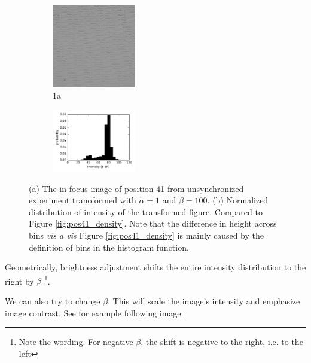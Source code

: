 \documentclass[pdftex,12pt,a4paper]{report}
\begin{document}
\begin{figure}[H]
\centering

\begin{subfigure}{\textwidth}
  \centering
  \includegraphics[width=0.4\textwidth]{images/pos_41_in_t0_br_up100}
  \caption{1a}
  \label{fig:pos41_brup100_bf}
\end{subfigure}%

\begin{subfigure}{\textwidth}
  \centering
  \includegraphics[width=0.4\textwidth]{images/pos_41_in_t0_br_up100_hist}
  \caption{}
  \label{fig:pos41_brup100_hist}
\end{subfigure}%

\caption{(a) The in-focus image of position 41 from unsynchronized experiment tranoformed with $\alpha=1$ and $\beta = 100$. (b) Normalized distribution of intensity of the transformed figure. Compared to Figure \ref{fig:pos41_density}. Note that the difference in height across bins \textit{vis a vis} Figure \ref{fig:pos41_density} is mainly caused by the definition of bins in the histogram function.}

\label{fig:pos41_brup100}
\end{figure}

Geometrically, brightness adjustment shifts the entire intensity distribution to the right by $\beta$ \footnote{Note the wording. For negative $\beta$, the shift is negative to the right, i.e. to the left}.

We can also try to change $\beta$. This will scale the image's intensity and emphasize image contrast. See for example following image:
\end{document}
